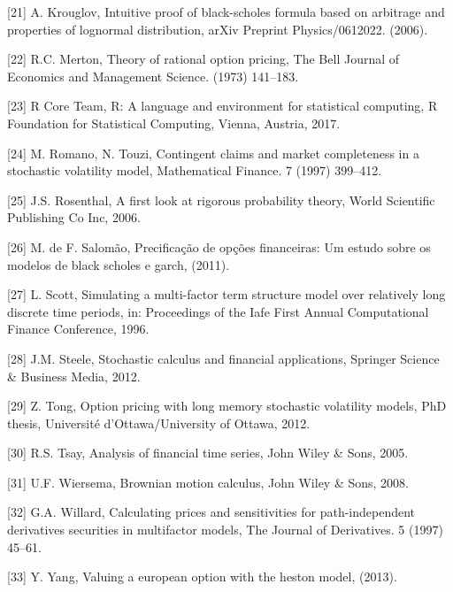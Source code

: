 \documentclass[12pt,twoside]{reedthesis}
\theoremstyle{definition}
\theoremstyle{definition}
\theoremstyle{remark}
\begin{document}
  \hypertarget{ref-krouglov2006intuitive}{}
  {[}21{]} A. Krouglov, Intuitive proof of black-scholes formula based on
  arbitrage and properties of lognormal distribution, arXiv Preprint
  Physics/0612022. (2006).
  
  \hypertarget{ref-merton1973theory}{}
  {[}22{]} R.C. Merton, Theory of rational option pricing, The Bell
  Journal of Economics and Management Science. (1973) 141--183.
  
  \hypertarget{ref-rlang}{}
  {[}23{]} R Core Team, R: A language and environment for statistical
  computing, R Foundation for Statistical Computing, Vienna, Austria,
  2017.
  
  \hypertarget{ref-romano1997}{}
  {[}24{]} M. Romano, N. Touzi, Contingent claims and market completeness
  in a stochastic volatility model, Mathematical Finance. 7 (1997)
  399--412.
  
  \hypertarget{ref-rosenthal}{}
  {[}25{]} J.S. Rosenthal, A first look at rigorous probability theory,
  World Scientific Publishing Co Inc, 2006.
  
  \hypertarget{ref-salomao2011precificaccao}{}
  {[}26{]} M. de F. Salomão, Precificação de opções financeiras: Um estudo
  sobre os modelos de black scholes e garch, (2011).
  
  \hypertarget{ref-scott1996}{}
  {[}27{]} L. Scott, Simulating a multi-factor term structure model over
  relatively long discrete time periods, in: Proceedings of the Iafe First
  Annual Computational Finance Conference, 1996.
  
  \hypertarget{ref-steele2012stochastic}{}
  {[}28{]} J.M. Steele, Stochastic calculus and financial applications,
  Springer Science \& Business Media, 2012.
  
  \hypertarget{ref-tong2012option}{}
  {[}29{]} Z. Tong, Option pricing with long memory stochastic volatility
  models, PhD thesis, Université d'Ottawa/University of Ottawa, 2012.
  
  \hypertarget{ref-tsay2005analysis}{}
  {[}30{]} R.S. Tsay, Analysis of financial time series, John Wiley \&
  Sons, 2005.
  
  \hypertarget{ref-ubbo}{}
  {[}31{]} U.F. Wiersema, Brownian motion calculus, John Wiley \& Sons,
  2008.
  
  \hypertarget{ref-willard1997}{}
  {[}32{]} G.A. Willard, Calculating prices and sensitivities for
  path-independent derivatives securities in multifactor models, The
  Journal of Derivatives. 5 (1997) 45--61.
  
  \hypertarget{ref-yang2013valuing}{}
  {[}33{]} Y. Yang, Valuing a european option with the heston model,
  (2013).


\end{document}
